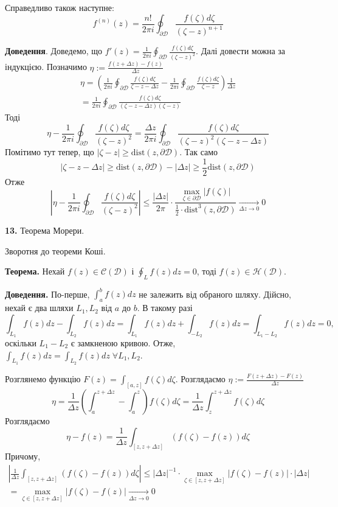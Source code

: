 \documentclass[14pt]{extarticle}
\begin{document}
Справедливо також наступне:
\[
f^{(n)}(z) = \frac{n!}{2\pi i}\oint_{\partial\mathcal{D}} \frac{f(\zeta)d\zeta}{(\zeta-z)^{n+1}}
\]

\textbf{Доведення}. Доведемо, що $f'(z) = \frac{1}{2\pi i}\oint_{\partial\mathcal{D}}\frac{f(\zeta)d\zeta}{(\zeta-z)^2}$. Далі довести можна за індукцією. Позначимо $\eta:=\frac{f(z+\Delta z)-f(z)}{\Delta z}$
\begin{gather*}
\eta = \left(\frac{1}{2\pi i}\oint_{\partial\mathcal{D}} \frac{f(\zeta)d\zeta}{\zeta-z-\Delta z}-\frac{1}{2\pi i}\oint_{\partial\mathcal{D}}\frac{f(\zeta)d\zeta}{\zeta-z}\right)\frac{1}{\Delta z} \\
= \frac{1}{2\pi i}\oint_{\partial \mathcal{D}}\frac{f(\zeta)d\zeta}{(\zeta-z-\Delta z)(\zeta - z)}
\end{gather*}
Тоді
\[
\eta - \frac{1}{2\pi i}\oint_{\partial\mathcal{D}} \frac{f(\zeta)d\zeta}{(\zeta-z)^2} = \frac{\Delta z}{2\pi i}\oint_{\partial\mathcal{D}} \frac{f(\zeta)d\zeta}{(\zeta-z)^2(\zeta-z-\Delta z)}
\]
Помітимо тут тепер, що $|\zeta-z| \geq \text{dist}(z,\partial\mathcal{D})$. Так само 
\[
|\zeta-z-\Delta z| \geq \text{dist}(z,\partial\mathcal{D})-|\Delta z| \geq \frac{1}{2}\text{dist}(z,\partial\mathcal{D})
\]
Отже
\[
\left|\eta - \frac{1}{2\pi i}\oint_{\partial\mathcal{D}} \frac{f(\zeta)d\zeta}{(\zeta-z)^2}\right| \leq \frac{|\Delta z|}{2\pi} \cdot \frac{\max_{\zeta \in \partial \mathcal{D}}|f(\zeta)|}{\frac{1}{2}\cdot \text{dist}^3(z,\partial\mathcal{D})} \xrightarrow[\Delta z \to 0]{} 0
\]

\textbf{13.} Теорема Морери.

Зворотня до теореми Коші. 

\textbf{Теорема.} Нехай $f(z) \in \mathcal{C}(\mathcal{D})$ і $\oint_L f(z)dz=0$, тоді $f(z) \in \mathcal{H}(\mathcal{D})$.

\textbf{Доведення.} По-перше, $\int_a^b f(z)dz$ не залежить від обраного шляху. Дійсно, нехай є два шляхи $L_1,L_2$ від $a$ до $b$. В такому разі
\[
\int_{L_1}f(z)dz - \int_{L_2}f(z)dz = \int_{L_1}f(z)dz + \int_{-L_2}f(z)dz = \int_{L_1-L_2}f(z)dz = 0,
\]
оскільки $L_1-L_2$ є замкненою кривою. Отже, $\int_{L_1}f(z)dz = \int_{L_2}f(z)dz \; \forall L_1,L_2$. 

Розглянемо функцію $F(z) = \int_{[a,z]}f(\zeta)d\zeta$. Розглядаємо $\eta:=\frac{F(z+\Delta z)-F(z)}{\Delta z}$
\[
\eta = \frac{1}{\Delta z} \left(\int_{a}^{z+\Delta z}-\int_a^z\right)f(\zeta)d\zeta = \frac{1}{\Delta z}\int_{z}^{z+\Delta z}f(\zeta)d\zeta
\]
Розглядаємо
\[
\eta - f(z) = \frac{1}{\Delta z}\int_{[z,z+\Delta z]}(f(\zeta)-f(z))d\zeta
\]
Причому,
\begin{gather*}
\left|\frac{1}{\Delta z}\int_{[z,z+\Delta z]}(f(\zeta)-f(z))d\zeta\right| \leq |\Delta z|^{-1} \cdot \max_{\zeta \in [z,z+\Delta z]}|f(\zeta)-f(z)| \cdot |\Delta z| \\
= \max_{\zeta \in [z,z+\Delta z]}|f(\zeta)-f(z)| \xrightarrow[\Delta z \to 0]{} 0
\end{gather*}
\end{document}
